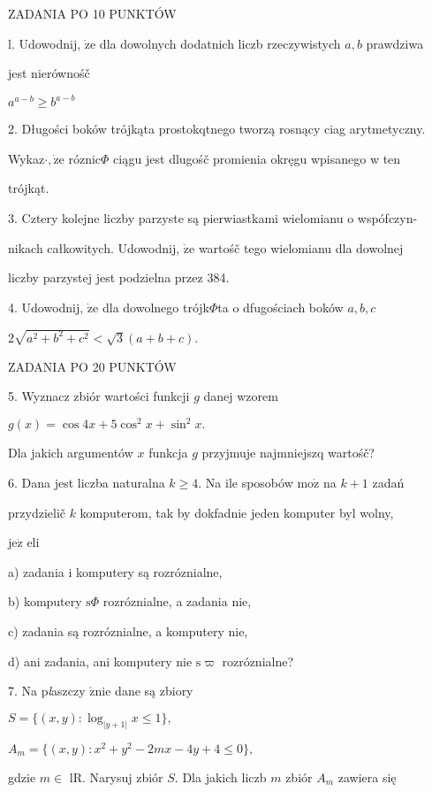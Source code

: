 \documentclass[a4paper,12pt]{article}
\begin{document}
ZADANIA PO 10 PUNKTÓW

l. Udowodnij, $\dot{\mathrm{z}}\mathrm{e}$ dla dowolnych dodatnich liczb rzeczywistych $a, b$ prawdziwa

jest nierównośč

$a^{a-b}\geq b^{a-b}$

2. Długości boków trójkąta prostokqtnego tworzą rosnący ciag arytmetyczny.

Wykaz$\cdot, \dot{\mathrm{z}}\mathrm{e}$ róznic$\Phi$ ciągu jest dlugośč promienia okręgu wpisanego w ten

trójkąt.

3. Cztery kolejne liczby parzyste są pierwiastkami wielomianu o wspófczyn-

nikach całkowitych. Udowodnij, $\dot{\mathrm{z}}\mathrm{e}$ wartośč tego wielomianu dla dowolnej

liczby parzystej jest podzielna przez 384.

4. Udowodnij, $\dot{\mathrm{z}}\mathrm{e}$ dla dowolnego trójk$\Phi$ta o dfugościach boków $a, b, c$

$2\sqrt{a^{2}+b^{2}+c^{2}}<\sqrt{3}(a+b+c).$

ZADANIA PO 20 PUNKTÓW

5. Wyznacz zbiór wartości funkcji $g$ danej wzorem

$g(x)=\cos 4x+5\cos^{2}x+\sin^{2}x.$

Dla jakich argumentów $x$ funkcja $g$ przyjmuje najmniejszq wartośč?

6. Dana jest liczba naturalna $k \geq 4$. Na ile sposobów $\mathrm{m}\mathrm{o}\dot{\mathrm{z}}$ na $k+1$ zadań

przydzielič $k$ komputerom, tak by dokfadnie jeden komputer byl wolny,

$\mathrm{j}\mathrm{e}\dot{\mathrm{z}}$ eli

a) zadania i komputery są rozróznialne,

b) komputery $\mathrm{s}\Phi$ rozróznialne, a zadania nie,

c) zadania są rozróznialne, a komputery nie,

d) ani zadania, ani komputery nie $\mathrm{s}\varpi$ rozróznialne?

7. Na p{\it l}aszczy $\acute{\mathrm{z}}\mathrm{n}\mathrm{i}\mathrm{e}$ dane są zbiory

$S=\{(x,y):\log_{|y+1|}x\leq 1\},$

$A_{m}=\{(x,y):x^{2}+y^{2}-2mx-4y+4\leq 0\},$

gdzie $m \in$ lR. Narysuj zbiór $S$. Dla jakich liczb $m$ zbiór $A_{m}$ zawiera się
\end{document}
